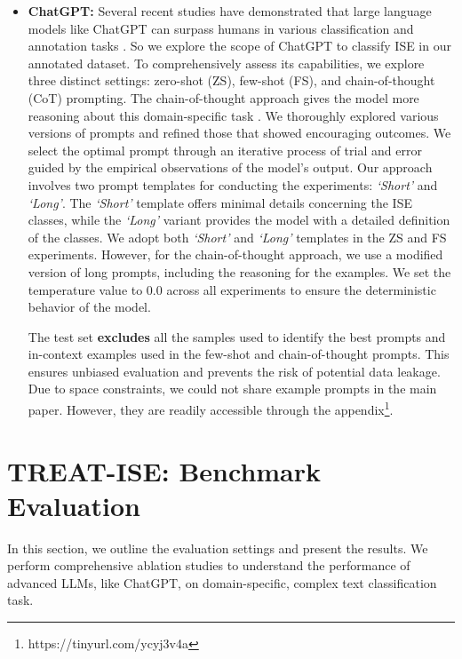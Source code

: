 \documentclass[letterpaper]{article}
\begin{document}
\begin{itemize}
    \item \textbf{ChatGPT:} Several recent studies have demonstrated that large language models like ChatGPT can surpass humans in various classification and annotation tasks \cite{10.1001/jamainternmed.2023.2909, Gilardi_2023}. So we explore the scope of ChatGPT \cite{ouyang2022training} to classify ISE in our annotated dataset. To comprehensively assess its capabilities, we explore three distinct settings: zero-shot (ZS), few-shot (FS), and chain-of-thought (CoT) \cite{NEURIPS2022_9d560961} prompting. The chain-of-thought approach gives the model more reasoning about this domain-specific task \cite{min-etal-2022-rethinking}.
    We thoroughly explored various versions of prompts and refined those that showed encouraging outcomes. We select the optimal prompt through an iterative process of trial and error guided by the empirical observations of the model's output. Our approach involves two prompt templates for conducting the experiments: \textit{`Short'} and \textit{`Long'}. The \textit{`Short'} template offers minimal details concerning the ISE classes, while the \textit{`Long'} variant provides the model with a detailed definition of the classes. We adopt both \textit{`Short'} and \textit{`Long'} templates in the ZS and FS experiments. However, for the chain-of-thought approach, we use a modified version of long prompts, including the reasoning for the examples. We set the temperature value to 0.0 across all experiments to ensure the deterministic behavior of the model.

    The test set \textbf{excludes} all the samples used to identify the best prompts and in-context examples used in the few-shot and chain-of-thought prompts. This ensures unbiased evaluation and prevents the risk of potential data leakage. Due to space constraints, we could not share example prompts in the main paper. However, they are readily accessible through the appendix\footnote{https://tinyurl.com/ycyj3v4a}.

\end{itemize}




\section{TREAT-ISE: Benchmark Evaluation}

In this section, we outline the evaluation settings and present the results. We perform comprehensive ablation studies to understand the performance of advanced LLMs, like ChatGPT, on domain-specific, complex text classification task.
\end{document}
